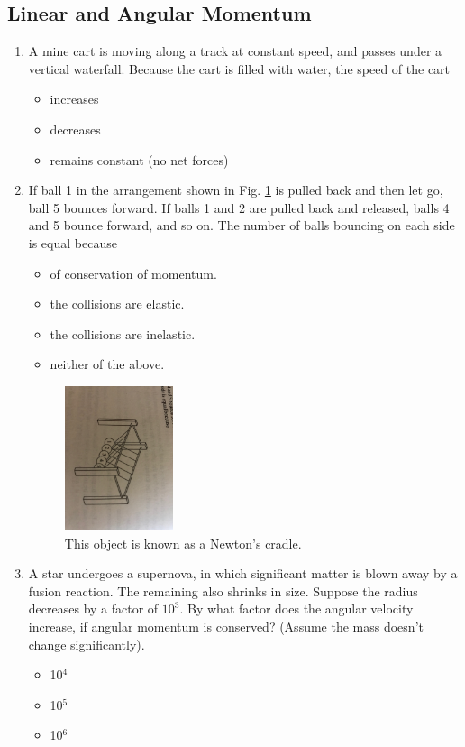 \documentclass[10pt]{article}
\begin{document}
\subsection{Linear and Angular Momentum}
\begin{enumerate}
\item A mine cart is moving along a track at constant speed, and passes under a vertical waterfall.  Because the cart is filled with water, the speed of the cart
\begin{itemize}
\item increases
\item decreases
\item remains constant (no net forces)
\end{itemize}
\item If ball 1 in the arrangement shown in Fig. \ref{fig:newton} is pulled back and then let go, ball 5 bounces forward.  If balls 1 and 2 are pulled back and released, balls 4 and 5 bounce forward, and so on.  The number of balls bouncing on each side is equal because
\begin{itemize}
\item of conservation of momentum.
\item the collisions are elastic.
\item the collisions are inelastic.
\item neither of the above.
\end{itemize}
\begin{figure}
\centering
\includegraphics[width=0.3\textwidth,trim=20cm 5cm 15cm 20cm,clip=true]{newton.jpeg}
\caption{\label{fig:newton} This object is known as a Newton's cradle.}
\end{figure}
\item A star undergoes a supernova, in which significant matter is blown away by a fusion reaction.  The remaining also shrinks in size.  Suppose the radius decreases by a factor of $10^3$.  By what factor does the angular velocity increase, if angular momentum is conserved? (Assume the mass doesn't change significantly).
\begin{itemize}
\item 10$^4$
\item 10$^5$
\item 10$^6$
\end{itemize}
\end{enumerate}
\end{document}
